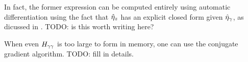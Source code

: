 In fact, the former expression can be computed entirely using automatic
differentiation using the fact that $\hat\eta_{z}$ has an explicit closed form given
$\hat\eta_{\gamma}$, as dicussed in .  TODO: is this worth writing
here?

When even $H_{\gamma\gamma}$ is too large to form in memory, one can
use the conjugate gradient algorithm.  TODO: fill in details.
